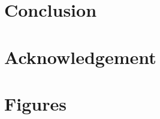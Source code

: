 \documentclass[a4paper,11pt]{article}
\begin{document}
\section{Conclusion}

\section*{Acknowledgement}


 

\section{Figures}

\end{document}
